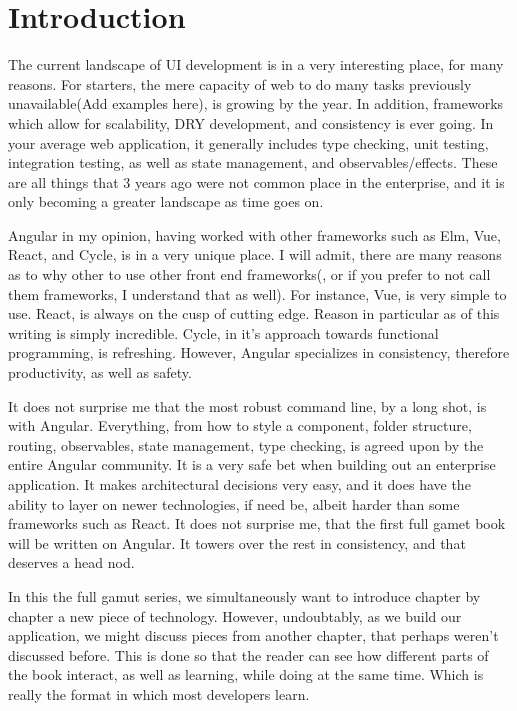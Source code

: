\maketitle{}
\section{Introduction}

The current landscape of UI development is in a very interesting place, for many
reasons. For starters, the mere capacity of web to do many tasks previously
unavailable(Add examples here), is growing by the year. In addition, frameworks
which allow for scalability, DRY development, and consistency is ever going. In
your average web application, it generally includes type checking, unit testing,
integration testing, as well as state management, and observables/effects. These
are all things that 3 years ago were not common place in the enterprise, and it
is only becoming a greater landscape as time goes on.

Angular in my opinion, having worked with other frameworks such as Elm, Vue,
React, and Cycle, is in a very unique place. I will admit, there are many
reasons as to why other to use other front end frameworks(, or if you prefer to
not call them frameworks, I understand that as well). For instance, Vue, is very
simple to use. React, is always on the cusp of cutting edge. Reason in
particular as of this writing is simply incredible. Cycle, in it's approach
towards functional programming, is refreshing. However, Angular specializes in
consistency, therefore productivity, as well as safety.

It does not surprise me that the most robust command line, by a long shot, is
with Angular. Everything, from how to style a component, folder structure,
routing, observables, state management, type checking, is agreed upon by the
entire Angular community. It is a very safe bet when building out an enterprise
application. It makes architectural decisions very easy, and it does have the
ability to layer on newer technologies, if need be, albeit harder than some
frameworks such as React. It does not surprise me, that the first full gamet
book will be written on Angular. It towers over the rest in consistency, and
that deserves a head nod.

In this the full gamut series, we simultaneously want to introduce chapter by
chapter a new piece of technology. However, undoubtably, as we build our
application, we might discuss pieces from another chapter, that perhaps weren't
discussed before. This is done so that the reader can see how different parts
of the book interact, as well as learning, while doing at the same time. Which
is really the format in which most developers learn.

